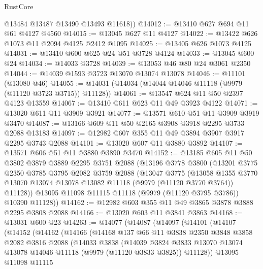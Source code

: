 \begin{lexlean}{RustCore}
\begin{coremodule}
        @13484
        @13487
        @13490
        @13493
        @11618))
@14012 := @13410 @627 @694 @11 @61 @4127 @4560
@14015 := @13045 @627 @11 @4127
@14022 := @13422 @626 @1073 @11 @2094 @4125 @2412 @1095
@14025 := @13405 @626 @1073 @4125
@14031 := @13410 @600 @625 @24 @51 @3728 @4124
@14033 := @13045 @600 @24
@14034 := @14033 @3728
@14039 := @13053 @46 @80 @24 @3061 @2350
@14044 := @14039 @1593 @3723 @13070 @13074 @13078
@14046 := @11101 (@13080 @46)
@14055 := @14031 (@14034 (@14044 @14046 @11118 (@9979 (@11120 @3723 @3715)) @11128))
@14061 := @13547 @624 @11 @50 @2397 @4123 @13559
@14067 := @13410 @611 @623 @11 @49 @3923 @4122
@14071 := @13020 @611 @11 @3909 @3921
@14077 := @13571 @610 @51 @11 @3909 @3919 @3470
@14087 := @13166 @609 @11 @50 @2165 @3908 @3918 @2295 @3733 @2088 @13183
@14097 := @12982 @607 @355 @11 @49 @3894 @3907 @3917 @2295 @3743 @2088
@14101 := @13020 @607 @11 @3880 @3892
@14107 := @13571 @606 @51 @11 @3880 @3890 @3470
@14152 := @13185
    @605
    @11
    @50
    @3802
    @3879
    @3889
    @2295
    @3751
    @2088
    (@13196
      @3778
      @3800
      (@13201
        @3775
        @2350
        @3785
        @3795
        @2082
        @3759
        @2088
        (@13047
          @3775
          (@13058
            @1355
            @3770
            @13070
            @13074
            @13078
            @13082
            @11118
            (@9979 (@11120 @3770 @3764))
            @11128))
        @13095
        @11098
        @11115
        @11118
        (@9979 (@11120 @3795 @3786))
        @10390
        @11128))
@14162 := @12982 @603 @355 @11 @49 @3865 @3878 @3888 @2295 @3808 @2088
@14166 := @13020 @603 @11 @3841 @3863
@14168 := @13031 @600 @23
@14263 := @14077
    (@14087
      (@14097
        (@14101
          (@14107
            (@14152
              (@14162
                (@14166
                  (@14168
                    @137
                    @66
                    @11
                    @3838
                    @2350
                    @3848
                    @3858
                    @2082
                    @3816
                    @2088
                    (@14033
                      @3838
                      (@14039
                        @3824
                        @3833
                        @13070
                        @13074
                        @13078
                        @14046
                        @11118
                        (@9979 (@11120 @3833 @3825))
                        @11128))
                    @13095
                    @11098
                    @11115

\end{coremodule}
\end{lexlean}

